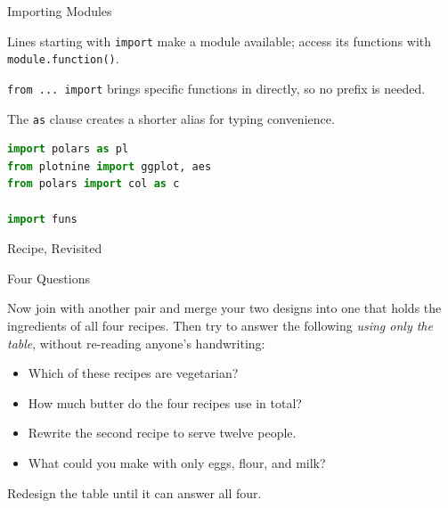 \documentclass[8pt,aspectratio=169]{beamer}
\begin{document}
\begin{frame}[fragile]{Importing Modules}
\begin{splitcode}{%

Lines starting with \texttt{import} make a module available; access its functions with \texttt{module.function()}.

\texttt{from ... import} brings specific functions in directly, so no prefix is needed.

The \texttt{as} clause creates a shorter alias for typing convenience.

}
\begin{lstlisting}[language=Python]
import polars as pl
from plotnine import ggplot, aes
from polars import col as c

import funs
\end{lstlisting}
\end{splitcode}
\end{frame}

\begin{rightframe}{Recipe, Revisited}
\end{rightframe}

\begin{textframe}{Four Questions}

Now join with another pair and merge your two designs into one that holds the
ingredients of all four recipes. Then try to answer the following \textit{using
only the table}, without re-reading anyone's handwriting:

\begin{itemize}
\item Which of these recipes are vegetarian?
\item How much butter do the four recipes use in total?
\item Rewrite the second recipe to serve twelve people.
\item What could you make with only eggs, flour, and milk?
\end{itemize}

Redesign the table until it can answer all four.

\end{textframe}
\end{document}
